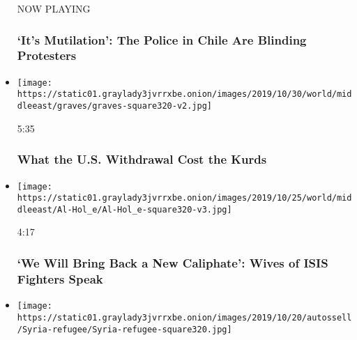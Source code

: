 \begin{itemize}
  NOW PLAYING

  \hypertarget{its-mutilation-the-police-in-chile-are-blinding-protesters-2}{%
  \subsubsection{`It's Mutilation': The Police in Chile Are Blinding
  Protesters}\label{its-mutilation-the-police-in-chile-are-blinding-protesters-2}}
\item
  \href{https://www.nytimes3xbfgragh.onion/video/world/middleeast/100000006789926/us-kurds.html?action=click\&module=video-series-bar\&region=header\&pgtype=Article\&playlistId=video/on-the-ground}{}

  \texttt{[image: https://static01.graylady3jvrrxbe.onion/images/2019/10/30/world/middleeast/graves/graves-square320-v2.jpg]}

  5:35

  \hypertarget{what-the-us-withdrawal-cost-the-kurds}{%
  \subsubsection{What the U.S. Withdrawal Cost the
  Kurds}\label{what-the-us-withdrawal-cost-the-kurds}}
\item
  \href{https://www.nytimes3xbfgragh.onion/video/world/middleeast/100000006777985/syria-isis-alhol-turkey-kurds.html?action=click\&module=video-series-bar\&region=header\&pgtype=Article\&playlistId=video/on-the-ground}{}

  \texttt{[image: https://static01.graylady3jvrrxbe.onion/images/2019/10/25/world/middleeast/Al-Hol\_e/Al-Hol\_e-square320-v3.jpg]}

  4:17

  \hypertarget{we-will-bring-back-a-new-caliphate-wives-of-isis-fighters-speak}{%
  \subsubsection{`We Will Bring Back a New Caliphate': Wives of ISIS
  Fighters
  Speak}\label{we-will-bring-back-a-new-caliphate-wives-of-isis-fighters-speak}}
\item
  \href{https://www.nytimes3xbfgragh.onion/video/world/middleeast/100000006757197/turkey-syria-invasion.html?action=click\&module=video-series-bar\&region=header\&pgtype=Article\&playlistId=video/on-the-ground}{}

  \texttt{[image: https://static01.graylady3jvrrxbe.onion/images/2019/10/20/autossell/Syria-refugee/Syria-refugee-square320.jpg]}


\end{itemize}
